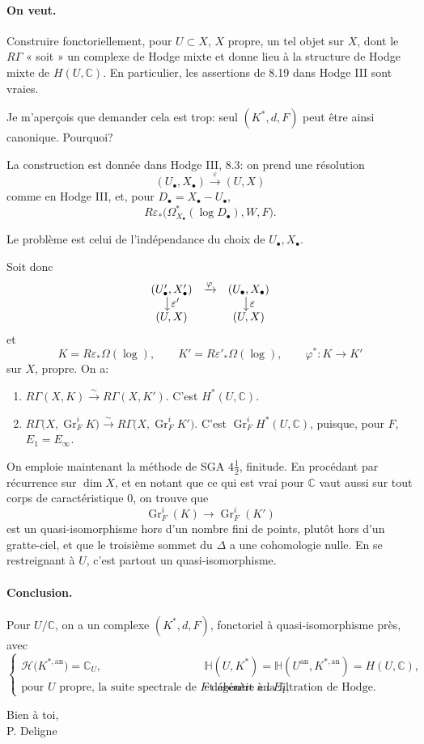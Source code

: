 \documentclass[11pt]{article}
\newcommand{\Gr}{\operatorname{Gr}}
\newcommand{\RG}{R\Gamma}
\newcommand{\HH}{\mathcal H}
\newcommand{\C}{\mathbb C}
\begin{document}
\paragraph{On veut.}
Construire fonctoriellement, pour \(U\subset X\), \(X\) propre, un tel objet sur \(X\), dont le \(R\Gamma\) « soit » un complexe de Hodge mixte et donne lieu à la structure de Hodge mixte de \(H(U,\C)\). En particulier, les assertions de 8.19 dans Hodge III sont vraies.

Je m'aperçois que demander cela est trop: seul \((K^\ast,d,F)\) peut être ainsi canonique. Pourquoi?

La construction est donnée dans Hodge III, 8.3: on prend une résolution
\[
  (U_\bullet,X_\bullet) \xrightarrow{\varepsilon} (U,X)
\]
comme en Hodge III, et, pour \(D_\bullet=X_\bullet-U_\bullet\),
\[
  R\varepsilon_\ast\bigl(\Omega^\ast_{X_\bullet}(\log D_\bullet),W,F\bigr).
\]

Le problème est celui de l'indépendance du choix de \(U_\bullet,X_\bullet\).

Soit donc
\[
\begin{array}{ccc}
(U'_\bullet,X'_\bullet) & \xrightarrow{\varphi} & (U_\bullet,X_\bullet)\\
\big\downarrow{\varepsilon'} && \big\downarrow{\varepsilon}\\
(U,X) && (U,X)
\end{array}
\]
et
\[
  K=R\varepsilon_\ast\Omega(\log),\qquad
  K'=R\varepsilon'_\ast\Omega(\log),\qquad
  \varphi^\ast:K\longrightarrow K'
\]
sur \(X\), propre. On a:
\begin{enumerate}[label=\arabic*)]
\item \(\RG(X,K)\xrightarrow{\sim}\RG(X,K')\). C'est \(H^\ast(U,\C)\).
\item \(\RG\bigl(X,\Gr_F^iK\bigr)\xrightarrow{\sim}\RG\bigl(X,\Gr_F^iK'\bigr)\). C'est \(\Gr_F^iH^\ast(U,\C)\), puisque, pour \(F\), \(E_1=E_\infty\).
\end{enumerate}

On emploie maintenant la méthode de SGA \(4\frac12\), finitude. En procédant par récurrence sur \(\dim X\), et en notant que ce qui est vrai pour \(\C\) vaut aussi sur tout corps de caractéristique \(0\), on trouve que
\[
  \Gr_F^i(K)\longrightarrow \Gr_F^i(K')
\]
est un quasi-isomorphisme hors d'un nombre fini de points, plutôt hors d'un gratte-ciel, et que le troisième sommet du \(\Delta\) a une cohomologie nulle. En se restreignant à \(U\), c'est partout un quasi-isomorphisme.

\paragraph{Conclusion.}
Pour \(U/\C\), on a un complexe \((K^\ast,d,F)\), fonctoriel à quasi-isomorphisme près, avec
\[
\begin{cases}
\HH\bigl(K^{\ast,\mathrm{an}}\bigr)=\C_U,
& \mathbb H(U,K^\ast)=\mathbb H(U^{\mathrm{an}},K^{\ast,\mathrm{an}})=H(U,\C),\\[0.35em]
\text{pour }U\text{ propre, la suite spectrale de }F\text{ dégénère en }E_1,
& \text{et aboutit à la filtration de Hodge.}
\end{cases}
\]

\begin{flushright}
Bien à toi,\\
P. Deligne
\end{flushright}
\end{document}
